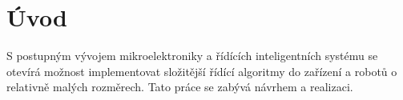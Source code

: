 \chapter{Úvod}
S postupným vývojem mikroelektroniky a řídících inteligentních systému se otevírá možnost implementovat složitější řídící algoritmy do zařízení a robotů o relativně malých rozměrech. Tato práce se zabývá návrhem a realizaci.

